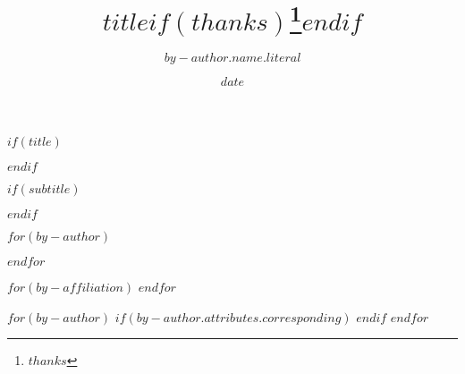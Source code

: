 $if(title)$
\title{$title$$if(thanks)$\thanks{$thanks$}$endif$}
$endif$


$if(subtitle)$
\usepackage{etoolbox}
\makeatletter
\providecommand{\subtitle}[1]{%
  \apptocmd{\@title}{\par {\large #1 \par}}{}{}
}
\makeatother
\subtitle{$subtitle$}
$endif$


$for(by-author)$
\author[$for(by-author.affiliations)$$it.number$$sep$,$endfor$$if(by-author.attributes.corresponding)$*$endif$]{$by-author.name.literal$}
$endfor$


$for(by-affiliation)$
$endfor$

$for(by-author)$
$if(by-author.attributes.corresponding)$
$endif$
$endfor$

\date{$date$}

